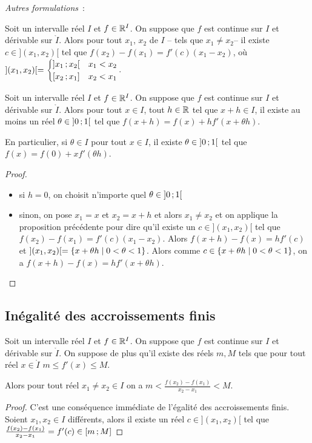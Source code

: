 \emph{Autres formulations}~:

\begin{prop}
  Soit un intervalle réel \(I\) et \(f \in \mathbb{R}^I\). On suppose que \(f\) est continue sur \(I\) et dérivable sur \(\mathring{I}\). Alors pour tout \(x_1\), \(x_2\) de \(I\) -- tels que \(x_1 \neq x_2\)-- il existe \(c \in ](x_1,x_2)[\) tel que \(f(x_2)-f(x_1)=f'(c)(x_1-x_2)\), où \( ](x_1,x_2)[ = \begin{cases} \left] x_1 \, ;  x_2 \right[ & x_1 < x_2 \\ \left[ x_2 \, ;  x_1 \right] & x_2 < x_1 \end{cases}\).
\end{prop}
\begin{prop}
  Soit un intervalle réel \(I\) et \(f \in \mathbb{R}^I\). On suppose que \(f\) est continue sur \(I\) et dérivable sur \(\mathring{I}\). Alors pour tout \(x \in I\), tout \(h \in \mathbb{R}\) tel que \(x+h \in I\), il existe au moins un réel \(\theta \in \left] 0 \, ;  1 \right[\) tel que \(f(x+h)=f(x)+hf'(x+\theta h)\). 

En particulier, si \(\theta \in I\) pour tout \(x \in I\), il existe \(\theta \in \left] 0 \, ;  1 \right[\) tel que \(f(x)=f(0)+xf'(\theta h)\).
\end{prop}
\begin{proof}
  \begin{itemize}
  \item si \(h=0\), on choisit n'importe quel \(\theta \in \left] 0 \, ;  1 \right[\)
  \item sinon, on pose \(x_1=x\) et \(x_2=x+h\) et alors \(x_1 \neq x_2\) et on applique la proposition précédente pour dire qu'il existe un \(c \in ](x_1,x_2)[\) tel que \(f(x_2)-f(x_1)=f'(c)(x_1-x_2)\). Alors \(f(x+h)-f(x)=hf'(c)\) et \(](x_1,x_2)[ = \left\{x+\theta h\mathrel{}\middle|\mathrel{}0 < \theta < 1\right\}\). Alors comme \(c \in \left\{x+\theta h\mathrel{}\middle|\mathrel{}0 < \theta < 1\right\}\), on a \(f(x+h)-f(x)=hf'(x + \theta h)\).
  \end{itemize}
\end{proof}

\subsection{Inégalité des accroissements finis}

\begin{theo}[IAF]\label{theo:iaf}
  Soit un intervalle réel \(I\) et \(f \in \mathbb{R}^I\). On suppose que \(f\) est continue sur \(I\) et dérivable sur \(\mathring{I}\). On suppose de plus qu'il existe des réels \(m,M\) tels que pour tout réel \(x \in \mathring{I}\) \(m \leqslant f'(x) \leqslant M\).

Alors pour tout réel \(x_1 \neq x_2 \in I\) on a \(m < \frac{f(x_2)-f(x_1)}{x_2-x_1} < M\).
\end{theo}
\begin{proof}
  C'est une conséquence immédiate de l'égalité des accroissements finis. Soient \(x_1, x_2 \in I\) différents, alors il existe un réel \(c \in ](x_1,x_2)[\) tel que \(\frac{f(x_2)-f(x_1)}{x_2-x_1} = f'(c) \in \left[ m \, ;  M \right]\)
\end{proof}

